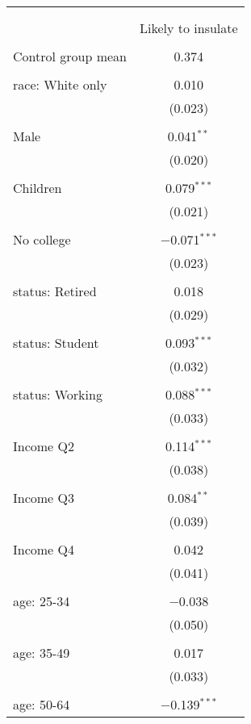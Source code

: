 
\begin{tabular}{@{\extracolsep{5pt}}lc} 
\\[-1.8ex]\hline 
\hline \\[-1.8ex] 
\\[-1.8ex] & Likely to insulate \\ 
\hline \\[-1.8ex] 
 Control group mean & 0.374  \\ \hline \\[-1.8ex] race: White only & 0.010 \\ 
  & (0.023) \\ 
  & \\ 
 Male & 0.041$^{**}$ \\ 
  & (0.020) \\ 
  & \\ 
 Children & 0.079$^{***}$ \\ 
  & (0.021) \\ 
  & \\ 
 No college & $-$0.071$^{***}$ \\ 
  & (0.023) \\ 
  & \\ 
 status: Retired & 0.018 \\ 
  & (0.029) \\ 
  & \\ 
 status: Student & 0.093$^{***}$ \\ 
  & (0.032) \\ 
  & \\ 
 status: Working & 0.088$^{***}$ \\ 
  & (0.033) \\ 
  & \\ 
 Income Q2 & 0.114$^{***}$ \\ 
  & (0.038) \\ 
  & \\ 
 Income Q3 & 0.084$^{**}$ \\ 
  & (0.039) \\ 
  & \\ 
 Income Q4 & 0.042 \\ 
  & (0.041) \\ 
  & \\ 
 age: 25-34 & $-$0.038 \\ 
  & (0.050) \\ 
  & \\ 
 age: 35-49 & 0.017 \\ 
  & (0.033) \\ 
  & \\ 
 age: 50-64 & $-$0.139$^{***}$ \\ 

\end{tabular}

